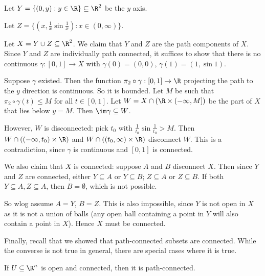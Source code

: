 \documentclass[a4paper]{article}
\begin{document}
\begin{eg}
  Let $Y = \{(0, y): y\in \R\}\subseteq \R^2$ be the $y$ axis.

  Let $Z = \{(x, \frac{1}{x}\sin \frac{1}{x}): x\in (0, \infty)\}$.
  \begin{center}
  \end{center}
  Let $X = Y\cup Z\subseteq \R^2$. We claim that $Y$ and $Z$ are the path components of $X$. Since $Y$ and $Z$ are individually path connected, it suffices to show that there is no continuous $\gamma: [0, 1]\to X$ with $\gamma(0) = (0, 0)$, $\gamma(1) = (1,\sin 1)$.

  Suppose $\gamma$ existed. Then the function $\pi_2\circ \gamma: [0, 1] \to \R$ projecting the path to the $y$ direction is continuous. So it is bounded. Let $M$ be such that $\pi_2\circ \gamma (t) \leq M$ for all $t\in [0, 1]$. Let $W = X\cap (\R \times (-\infty, M])$ be the part of $X$ that lies below $y = M$. Then $\im \gamma \subseteq W$.

  However, $W$ is disconnected: pick $t_0$ with $\frac{1}{t_0} \sin\frac{1}{t_0} > M$. Then $W \cap ((-\infty, t_0)\times \R)$ and $W\cap ((t_0, \infty)\times \R)$ disconnect $W$. This is a contradiction, since $\gamma$ is continuous and $[0, 1]$ is connected.

  We also claim that $X$ is connected: suppose $A$ and $B$ disconnect $X$. Then since $Y$ and $Z$ are connected, either $Y\subseteq A$ or $Y\subseteq B$; $Z\subseteq A$ or $Z\subseteq B$. If both $Y\subseteq A, Z\subseteq A$, then $B=\emptyset$, which is not possible.

  So wlog assume $A = Y$, $B = Z$. This is also impossible, since $Y$ is not open in $X$ as it is not a union of balls (any open ball containing a point in $Y$ will also contain a point in $X$). Hence $X$ must be connected.
\end{eg}

Finally, recall that we showed that path-connected subsets are connected. While the converse is not true in general, there are special cases where it is true.
\begin{prop}
  If $U\subseteq \R^n$ is open and connected, then it is path-connected.
\end{prop}
\end{document}
